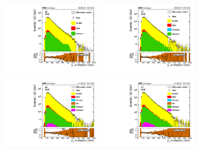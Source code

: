 \begin{figure}[htbp]
  \centering

  \includegraphics[width=0.45\textwidth]{figures/2016/AfterNormSF_ZCand_Pt_HNWR_SingleElectron_OnZ.pdf}
  \hspace{0.01\textwidth}
  \includegraphics[width=0.45\textwidth]{figures/2016/AfterNormSF_ZCand_Pt_HNWR_SingleMuon_OnZ.pdf}
  \vspace{0.01\textwidth}

  \includegraphics[width=0.45\textwidth]{figures/2017/AfterNormSF_ZCand_Pt_HNWR_SingleElectron_OnZ.pdf}
  \hspace{0.01\textwidth}
  \includegraphics[width=0.45\textwidth]{figures/2017/AfterNormSF_ZCand_Pt_HNWR_SingleMuon_OnZ.pdf}
  \vspace{0.01\textwidth}
  

\end{figure}
